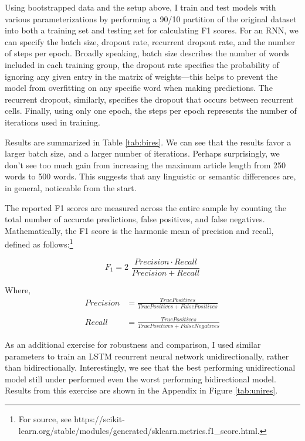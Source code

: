 \documentclass{article}
\begin{document}
	Using bootstrapped data and the setup above, I train and test models with various parameterizations by performing a 90/10 partition of the original dataset into both a training set and testing set for calculating F1 scores. For an RNN, we can specify the batch size, dropout rate, recurrent dropout rate, and the number of steps per epoch. Broadly speaking, batch size describes the number of words included in each training group, the dropout rate specifies the probability of ignoring any given entry in the matrix of weights---this helps to prevent the model from overfitting on any specific word when making predictions. The recurrent dropout, similarly, specifies the dropout that occurs between recurrent cells. Finally, using only one epoch, the steps per epoch represents the number of iterations used in training. 
	
	Results are summarized in Table \ref{tab:bires}. We can see that the results favor a larger batch size, and a larger number of iterations. Perhaps surprisingly, we don't see too much gain from increasing the maximum article length from 250 words to 500 words. This suggests that any linguistic or semantic differences are, in general, noticeable from the start. 
	
	
	
	The reported F1 scores are measured across the entire sample by counting the total number of accurate predictions, false positives, and false negatives. Mathematically, the F1 score is the harmonic mean of precision and recall, defined as follows:\footnote{For source, see https://scikit-learn.org/stable/modules/generated/sklearn.metrics.f1\_score.html.} 
	
	\begin{equation*}
		F_1 =  2 \,\, \frac{Precision \cdot Recall}{Precision + Recall}
	\end{equation*}
	
	Where, 
	\begin{align*}
		Precision &= \frac{True Positives}{True Positives + False Positives}\\ \\
		Recall &= \frac{True Positives}{True Positives + False Negatives}
	\end{align*}
	
	As an additional exercise for robustness and comparison, I used similar parameters to train an LSTM recurrent neural network unidirectionally, rather than bidirectionally. Interestingly, we see that the best performing unidirectional model still under performed even the worst performing bidirectional model. Results from this exercise are shown in the Appendix in Figure \ref{tab:unires}.
	
\end{document}
